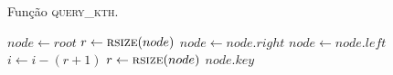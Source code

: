 \begin{algorithm}
    \caption{Função \textsc{query\_kth}.} \label{abb:query}
\begin{algorithmic}[1]
        \State $node \leftarrow root$
        \State $r \leftarrow \Call{rsize}{node}$
            \State $node \leftarrow node.right$
        \Else
            \State $node \leftarrow node.left$
            \State $i \leftarrow i - (r + 1)$
        \EndIf
        \State $r \leftarrow \Call{rsize}{node}$
        \EndWhile
        \State \Return $node.key$
    \EndFunction
\end{algorithmic}
\end{algorithm}